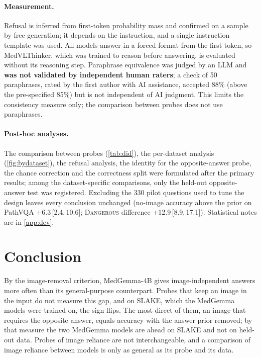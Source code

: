 \documentclass[10pt,twocolumn,letterpaper]{article}
\newcommand{\dang}{\textup{\textsc{Dangerous}}}
\newcommand{\ci}[2]{\,[#1,\,#2]}  %
\begin{document}
\paragraph{Measurement.} Refusal is inferred from first-token probability mass and confirmed on a sample by free
generation; it depends on the instruction, and a single instruction template was used. All models answer in a
forced format from the first token, so MedVLThinker, which was trained to reason before answering, is evaluated
without its reasoning step. Paraphrase equivalence was judged by an LLM and \textbf{was not validated by
independent human raters}; a check of 50 paraphrases, rated by the first author with AI assistance, accepted 88\%
(above the pre-specified 85\%) but is not independent of AI judgment. This limits the consistency measure only;
the comparison between probes does not use paraphrases.

\paragraph{Post-hoc analyses.} The comparison between probes (\cref{tab:did}), the per-dataset analysis
(\cref{fig:bydataset}), the refusal analysis, the identity for the opposite-answer probe, the chance correction and
the correctness split were formulated after the primary results; among the dataset-specific comparisons, only the
held-out opposite-answer test was registered. Excluding the 330 pilot questions used to tune the design leaves
every conclusion unchanged (no-image accuracy above the prior on PathVQA +6.3\ci{2.4}{10.6}; \dang{} difference
+12.9\ci{8.9}{17.1}). Statistical notes are in \cref{app:dev}.

\section{Conclusion}
\label{sec:conclusion}
By the image-removal criterion, MedGemma-4B gives image-independent answers more often than its general-purpose
counterpart. Probes that keep an image in the input do not measure this gap, and on SLAKE, which the MedGemma
models were trained on, the sign flips. The most direct of them, an image that requires the opposite answer,
equals accuracy with the answer prior removed; by that measure the two MedGemma models are ahead on SLAKE and not
on held-out data. Probes of image reliance are not interchangeable, and a comparison of image reliance between
models is only as general as its probe and its data.

{
    \small
    
    
}
\end{document}
